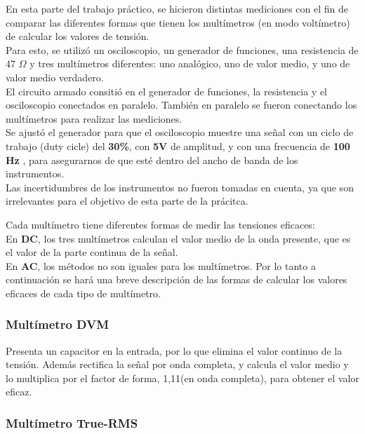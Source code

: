 \documentclass{article}
\begin{document}
En esta parte del trabajo práctico, se hicieron distintas mediciones con el fin de comparar las diferentes formas que tienen los multímetros (en modo voltímetro) de calcular los valores de tensión.\\
\indent Para esto, se utilizó un osciloscopio, un generador de funciones, una resistencia de 47 $\Omega$ y tres multímetros diferentes: uno analógico, uno de valor medio, y uno de valor medio verdadero.\\
\indent El circuito armado consitió en el generador de funciones, la resistencia y el osciloscopio conectados en paralelo. También en paralelo se fueron conectando los multímetros para realizar las mediciones. \\
\indent Se ajustó el generador para que el osciloscopio muestre una señal con un ciclo de trabajo (duty cicle) del \textbf{30\%},
con \textbf{5V} de amplitud, y con una frecuencia de \textbf{100 Hz} , para asegurarnos de que esté dentro del ancho de banda de los instrumentos.\\
\indent Las incertidumbres de los instrumentos no fueron tomadas en cuenta, ya que son irrelevantes para el objetivo de esta parte de la prácitca.
\medskip

Cada multímetro tiene diferentes formas de medir las tensiones eficaces:\\

En \textbf{DC}, los tres multímetros calculan el valor medio de la onda presente, que es el valor de la parte continua de la señal.\\

En \textbf{AC}, los métodos no son iguales para los multímetros. Por lo tanto a continuación se hará una breve descripción de las formas de calcular los valores eficaces de cada tipo de multímetro.



\subsubsection{Multímetro DVM}

Presenta un capacitor en la entrada, por lo que elimina el valor continuo de la tensión. Además rectifica la señal por onda completa, y calcula el valor medio y lo multiplica por el factor de forma, 1,11(en onda completa), para obtener el valor eficaz.\\
\smallskip



\subsubsection{Multímetro True-RMS}
\end{document}
